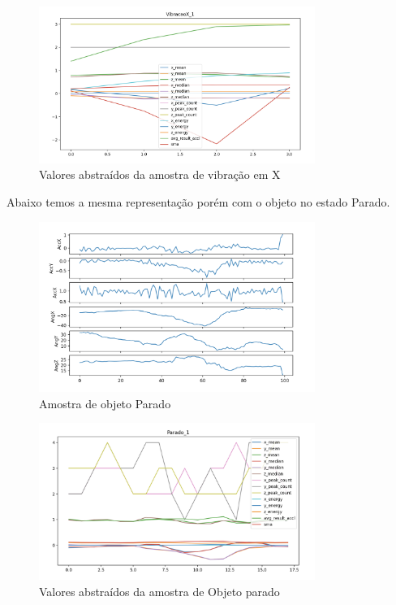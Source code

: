 \begin{figure}[H]
    \center
    \includegraphics[width=9cm]{images/VibracaoX_1_stats.png}
    \caption{ Valores abstraídos da amostra de vibração em X }
\end{figure}


Abaixo temos a mesma representação porém com o objeto no estado Parado.


\begin{figure}[H]
    \center
    \includegraphics[width=9cm]{images/Parado_1_raw.png}
    \caption{Amostra de objeto Parado}
\end{figure}

\begin{figure}[H]
    \center
    \includegraphics[width=9cm]{images/Parado_1_stats.png}
    \caption{ Valores abstraídos da amostra de Objeto parado }
\end{figure}

